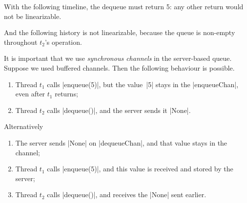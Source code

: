 
\begin{slide}

With the following timeline, the dequeue must return 5: any other return would
not be linearizable.
%

And the following history is not linearizable, because the queue is non-empty
throughout $t_2$'s operation.
%
\scalaMid
\end{slide}




\begin{slide}

It is important that we use \emph{synchronous channels} in the server-based
queue.  Suppose we used buffered channels.  Then the following behaviour is
possible.
%
\begin{enumerate}
\item Thread $t_1$ calls |enqueue(5)|, but the value~|5| stays in the
  |enqueueChan|, even after $t_1$ returns;

\item Thread $t_2$ calls |dequeue()|, and the server sends it |None|.
\end{enumerate}

Alternatively
%
\begin{enumerate}
\item The server sends |None| on |dequeueChan|, and that value stays in the
  channel; 

\item Thread $t_1$ calls |enqueue(5)|, and this value is received and stored
  by the server; 

\item Thread $t_2$ calls |dequeue()|, and receives the |None| sent earlier.
\end{enumerate}
\end{slide}

